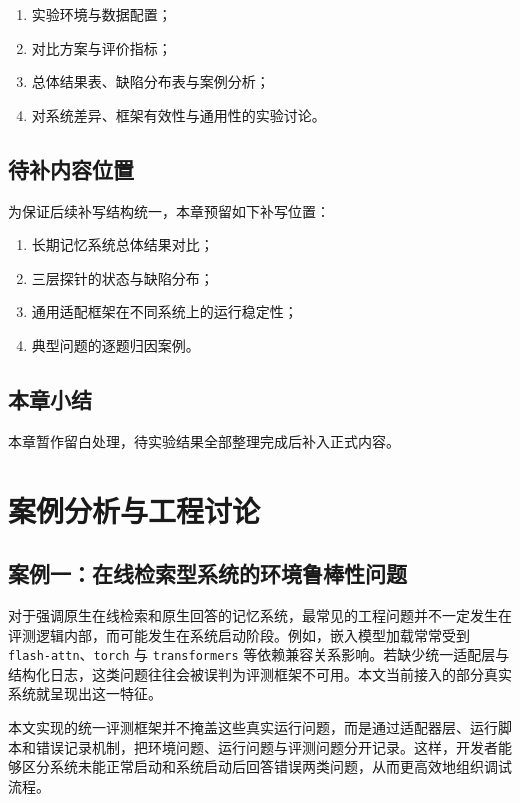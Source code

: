 \begin{enumerate}
    \item 实验环境与数据配置；
    \item 对比方案与评价指标；
    \item 总体结果表、缺陷分布表与案例分析；
    \item 对系统差异、框架有效性与通用性的实验讨论。
\end{enumerate}

\section{待补内容位置}

为保证后续补写结构统一，本章预留如下补写位置：

\begin{enumerate}
    \item 长期记忆系统总体结果对比；
    \item 三层探针的状态与缺陷分布；
    \item 通用适配框架在不同系统上的运行稳定性；
    \item 典型问题的逐题归因案例。
\end{enumerate}

\section{本章小结}

本章暂作留白处理，待实验结果全部整理完成后补入正式内容。

\chapter{案例分析与工程讨论}

\section{案例一：在线检索型系统的环境鲁棒性问题}

对于强调原生在线检索和原生回答的记忆系统，最常见的工程问题并不一定发生在评测逻辑内部，而可能发生在系统启动阶段。例如，嵌入模型加载常常受到 \texttt{flash-attn}、\texttt{torch} 与 \texttt{transformers} 等依赖兼容关系影响。若缺少统一适配层与结构化日志，这类问题往往会被误判为评测框架不可用。本文当前接入的部分真实系统就呈现出这一特征。

本文实现的统一评测框架并不掩盖这些真实运行问题，而是通过适配器层、运行脚本和错误记录机制，把环境问题、运行问题与评测问题分开记录。这样，开发者能够区分系统未能正常启动和系统启动后回答错误两类问题，从而更高效地组织调试流程。

